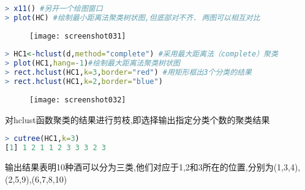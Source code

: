 \documentclass[11pt,a4paper,oneside]{book}
\begin{document}
\begin{lstlisting}[language=r]
> x11() #另开一个绘图窗口
> plot(HC) #绘制最小距离法聚类树状图,但底部对不齐. 两图可以相互对比
\end{lstlisting}
\begin{figure}[H]
	\centering
	\texttt{[image: screenshot031]}
	\label{fig:screenshot031}
\end{figure}

\begin{lstlisting}[language=r]
> HC1<-hclust(d,method="complete") #采用最大距离法（complete）聚类
> plot(HC1,hang=-1)#绘制最大距离法聚类树状图
> rect.hclust(HC1,k=3,border="red") #用矩形框出3个分类的结果
> rect.hclust(HC1,k=2,border="blue")
\end{lstlisting}
\begin{figure}[H]
	\centering
	\texttt{[image: screenshot032]}
	\label{fig:screenshot032}
\end{figure}

对hclust函数聚类的结果进行剪枝,即选择输出指定分类个数的聚类结果
\begin{lstlisting}[language=r]
> cutree(HC1,k=3)
[1] 1 2 1 1 2 3 3 3 2 3
\end{lstlisting}
输出结果表明10种酒可以分为三类,他们对应于1,2和3所在的位置,分别为(1,3,4),(2,5,9),(6,7,8,10)
\end{document}
